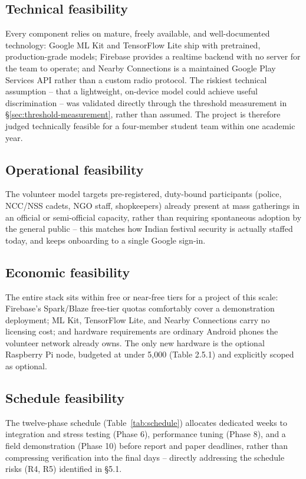 \documentclass[12pt,a4paper,oneside]{report}
\begin{document}
\subsection*{Technical feasibility}
Every component relies on mature, freely available, and well-documented
technology: Google ML Kit \cite{mlkit} and TensorFlow Lite \cite{tflite}
ship with pretrained, production-grade models; Firebase \cite{firebase}
provides a realtime backend with no server for the team to operate; and
Nearby Connections \cite{nearby} is a maintained Google Play Services API
rather than a custom radio protocol. The riskiest
technical assumption -- that a lightweight, on-device model could achieve
useful discrimination -- was validated directly through the threshold
measurement in \S\ref{sec:threshold-measurement}, rather than assumed. The project is therefore judged
technically feasible for a four-member student team within one academic
year.

\subsection*{Operational feasibility}
The volunteer model targets pre-registered, duty-bound participants
(police, NCC/NSS cadets, NGO staff, shopkeepers) already present at mass
gatherings in an official or semi-official capacity, rather than requiring
spontaneous adoption by the general public -- this matches how Indian
festival security is actually staffed today, and keeps onboarding to a
single Google sign-in.

\subsection*{Economic feasibility}
The entire stack sits within free or near-free tiers for a project of this
scale: Firebase's Spark/Blaze free-tier quotas comfortably cover a
demonstration deployment; ML Kit, TensorFlow Lite, and Nearby Connections
carry no licensing cost; and hardware requirements are ordinary
Android phones the volunteer network already owns. The only new hardware
is the optional Raspberry Pi node, budgeted at under 5{,}000 (Table 2.5.1)
and explicitly scoped as optional.

\subsection*{Schedule feasibility}
The twelve-phase schedule (Table~\ref{tab:schedule}) allocates dedicated
weeks to integration and stress testing (Phase 6), performance tuning
(Phase 8), and a field demonstration (Phase 10) before report and paper
deadlines, rather than compressing verification into the final days --
directly addressing the schedule risks (R4, R5) identified in \S5.1.
\end{document}
